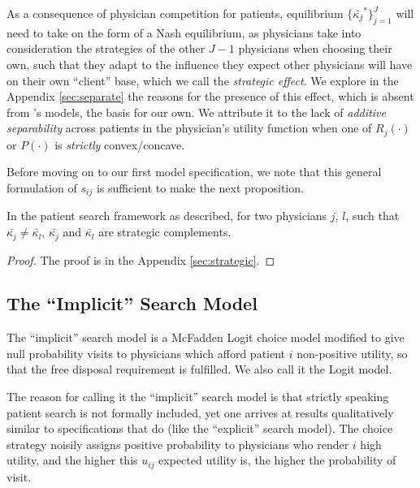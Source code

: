 \documentclass[../main.tex]{subfiles}
\begin{document}
As a consequence of physician competition for patients, equilibrium $\{\bar{\kappa_j}^*\}_{j =1}^{J}$ will need to take on the form of a Nash equilibrium, as physicians take into consideration the strategies of the other $J - 1$ physicians when choosing their own, such that they adapt to the influence they expect other physicians will have on their own ``client'' base, which we call the \textit{strategic effect}. We explore in the Appendix \ref{sec:separate} the reasons for the presence of this effect, which is absent from \citeauthor{schnell2017physician}'s models, the basis for our own. We attribute it to the lack of \textit{additive separability} across patients in the physician's utility function when one of $R_j(\cdot)$ or $P(\cdot)$ is \textit{strictly} convex/concave.

Before moving on to our first model specification, we note that this general formulation of $s_{ij}$ is sufficient to make the next proposition.

\begin{prop}
    \label{complements}
In the patient search framework as described, for two physicians $j$, $l$, such that $\bar{\kappa_j} \neq \bar{\kappa_l}$, $\bar{\kappa_j}$ and $\bar{\kappa_l}$ are strategic complements.
\end{prop}

\begin{proof}
    The proof is in the Appendix \ref{sec:strategic}.
\end{proof}







\subsection{The ``Implicit'' Search Model}

The ``implicit'' search model is a McFadden Logit choice model modified to give null probability visits to physicians which afford patient $i$ non-positive utility, so that the free disposal requirement is fulfilled. We also call it the Logit model.

The reason for calling it the ``implicit'' search model is that strictly speaking patient search is not formally included, yet one arrives at results qualitatively similar to specifications that do (like the ``explicit'' search model). The choice strategy noisily assigns positive probability to physicians who render $i$ high utility, and the higher this $u_{ij}$ expected utility is, the higher the probability of visit.
\end{document}
